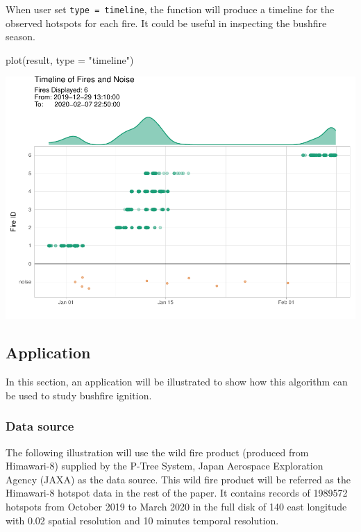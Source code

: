 When user set
\texttt{type\ =\ \textquotesingle{}timeline\textquotesingle{}}, the
function will produce a timeline for the observed hotspots for each
fire. It could be useful in inspecting the bushfire season.

\begin{Schunk}
\begin{Sinput}
plot(result, type = "timeline")
\end{Sinput}


\begin{center}\includegraphics[width=0.8\linewidth]{clustering_paper_files/figure-latex/unnamed-chunk-13-1} \end{center}

\end{Schunk}

\hypertarget{application}{%
\subsection{Application}\label{application}}

In this section, an application will be illustrated to show how this
algorithm can be used to study bushfire ignition.

\hypertarget{data-source}{%
\subsubsection{Data source}\label{data-source}}

The following illustration will use the wild fire product (produced from
Himawari-8) supplied by the P-Tree System, Japan Aerospace Exploration
Agency (JAXA) \citeyearpar{jaxa} as the data source. This wild fire
product will be referred as the Himawari-8 hotspot data in the rest of
the paper. It contains records of 1989572 hotspots from October 2019 to
March 2020 in the full disk of 140 \textdegree east longitude with 0.02
\textdegree spatial resolution and 10 minutes temporal resolution.

